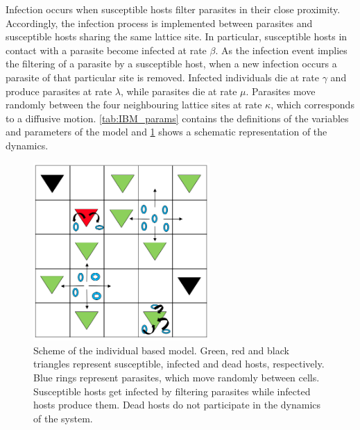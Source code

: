 Infection occurs when susceptible hosts filter parasites in their close
proximity. Accordingly, the infection process is implemented between parasites
and susceptible hosts sharing the same lattice site. In particular, susceptible
hosts in contact with a parasite become infected at rate $\beta$. As the
infection event implies the filtering of a parasite by a susceptible host, when
a new infection occurs a parasite of that particular site is removed. Infected
individuals die at rate $\gamma$ and produce parasites at rate $\lambda$, while
parasites die at rate $\mu$. Parasites move randomly between the four
neighbouring lattice sites at rate $\kappa$, which corresponds to a diffusive
motion. \cref{tab:IBM_params} contains the definitions of the variables and
parameters of the model and \cref{fig:IBM} shows a schematic representation of
the dynamics.

\begin{figure}[H]
    \centering
    \includegraphics[width=0.6\textwidth]{Figures/IBM.png}
    \caption[Scheme of the individual based SIRP model]{Scheme of the
        individual based model. Green, red and black
        triangles represent susceptible, infected and dead hosts, respectively.
        Blue
        rings represent parasites, which move randomly between cells.
        Susceptible hosts
        get infected by filtering parasites while infected hosts produce them.
        Dead
        hosts do not participate in the dynamics of the system.}
    \label{fig:IBM}
\end{figure}

